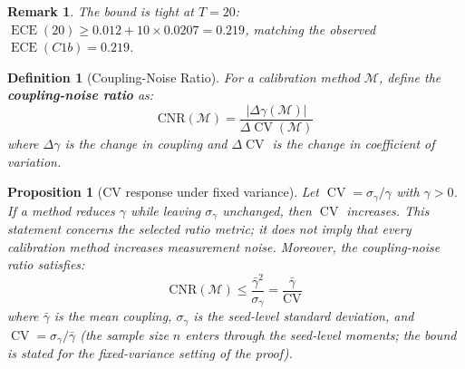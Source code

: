 \documentclass[11pt]{article}
\DeclareMathOperator{\CV}{CV}
\DeclareMathOperator{\ECE}{ECE}
\newtheorem{definition}{Definition}
\newtheorem{remark}{Remark}
\newtheorem{proposition}[theorem]{Proposition}
\begin{document}
\begin{remark}
The bound is tight at $T{=}20$: $\ECE(20) \geq 0.012 + 10 \times 0.0207 = 0.219$, matching the observed $\ECE(C1b) = 0.219$.
\end{remark}

\begin{definition}[Coupling-Noise Ratio]
For a calibration method $\mathcal{M}$, define the \textbf{coupling-noise ratio} as:
\begin{equation}
    \text{CNR}(\mathcal{M}) = \frac{|\Delta\gamma(\mathcal{M})|}{\Delta\CV(\mathcal{M})}
\end{equation}
where $\Delta\gamma$ is the change in coupling and $\Delta\CV$ is the change in coefficient of variation.
\end{definition}

\begin{proposition}[CV response under fixed variance]\label{thm:tradeoff}
Let $\CV=\sigma_\gamma/\gamma$ with $\gamma>0$. If a method reduces $\gamma$ while leaving $\sigma_\gamma$ unchanged, then $\CV$ increases. This statement concerns the selected ratio metric; it does not imply that every calibration method increases measurement noise.
Moreover, the coupling-noise ratio satisfies:
\begin{equation}
    \text{CNR}(\mathcal{M}) \leq \frac{\bar{\gamma}^2}{\sigma_{\gamma}} = \frac{\bar{\gamma}}{\CV}
\end{equation}
where $\bar{\gamma}$ is the mean coupling, $\sigma_{\gamma}$ is the seed-level standard deviation, and $\CV = \sigma_{\gamma}/\bar{\gamma}$ (the sample size $n$ enters through the seed-level moments; the bound is stated for the fixed-variance setting of the proof).
\end{proposition}
\end{document}
